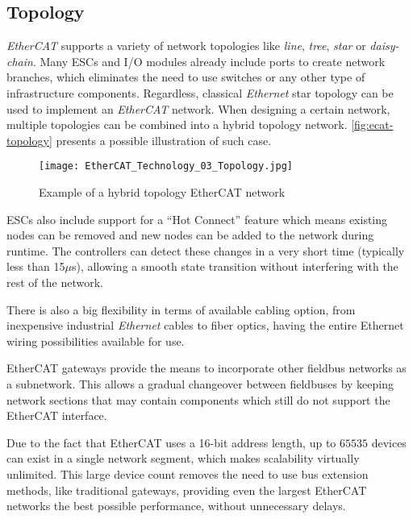 \subsection{Topology} \label{subsec:ecat-topology}

\emph{EtherCAT} supports a variety of network topologies like \emph{line}, \emph{tree}, \emph{star} or \emph{daisy-chain}.
Many ESCs and I/O modules already include ports to create network branches, which eliminates the need to use switches or any other type of infrastructure components.
Regardless, classical \emph{Ethernet} star topology can be used to implement an \emph{EtherCAT} network.
When designing a certain network, multiple topologies can be combined into a hybrid topology network.
\autoref{fig:ecat-topology} presents a possible illustration of such case.

\begin{figure}[htp]
	\centering
	\texttt{[image: EtherCAT\_Technology\_03\_Topology.jpg]}
	\caption{Example of a hybrid topology EtherCAT network \cite{protocol:ethercat}}
	\label{fig:ecat-topology}
\end{figure}

ESCs also include support for a ``Hot Connect'' feature which means existing nodes can be removed and new nodes can be added to the network during runtime.
The controllers can detect these changes in a very short time (typically less than 15$\mu$s), allowing a smooth state transition without interfering with the rest of the network.

There is also a big flexibility in terms of available cabling option, from inexpensive industrial \emph{Ethernet} cables to fiber optics, having the entire Ethernet wiring possibilities available for use.

EtherCAT gateways provide the means to incorporate other fieldbus networks as a subnetwork.
This allows a gradual changeover between fieldbuses by keeping network sections that may contain components which still do not support the EtherCAT interface.

Due to the fact that EtherCAT uses a 16-bit address length, up to $65535$ devices can exist in a single network segment, which makes scalability virtually unlimited.
This large device count removes the need to use bus extension methods, like traditional gateways, providing even the largest EtherCAT networks the best possible performance, without unnecessary delays.
